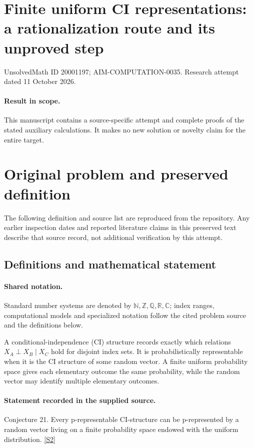 \documentclass[11pt]{article}
\begin{document}
\section*{Finite uniform CI representations: a rationalization route and its unproved step}
\noindent UnsolvedMath ID 20001197; AIM-COMPUTATION-0035. Research attempt dated 11 October 2026.
\paragraph{Result in scope.}This manuscript contains a source-specific attempt and complete proofs of the stated auxiliary calculations. It makes no new solution or novelty claim for the entire target.
\section{Original problem and preserved definition}
The following definition and source list are reproduced from the repository. Any earlier inspection dates and reported literature claims in this preserved text describe that source record, not additional verification by this attempt.
\subsection{Definitions and mathematical statement}

\paragraph{Shared notation.}Standard number systems are denoted by $\mathbb N,\mathbb Z,\mathbb Q,\mathbb R,\mathbb C$; index ranges, computational models and specialized notation follow the cited problem source and the definitions below.


A conditional-independence (CI) structure records exactly which relations $X_A\perp X_B\mid X_C$ hold for disjoint index sets. It is probabilistically representable when it is the CI structure of some random vector. A finite uniform probability space gives each elementary outcome the same probability, while the random vector may identify multiple elementary outcomes.
\paragraph{Statement recorded in the supplied source.}
Conjecture 21. Every p-representable CI-structure can be p-represented by a random vector living on a finite probability space endowed with the uniform distribution. \href{https://aimath.org/WWN/compalgstat/compalgstat.pdf}{[S2]}
\end{document}

